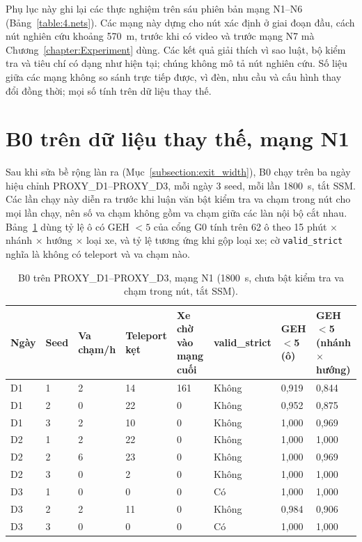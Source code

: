 \documentclass[../main.tex]{subfiles}
\begin{document}

Phụ lục này ghi lại các thực nghiệm trên sáu phiên bản mạng N1--N6 (Bảng~\ref{table:4.nets}). Các mạng này dựng cho nút xác định ở giai đoạn đầu, cách nút nghiên cứu khoảng 570~m, trước khi có video và trước mạng N7 mà Chương~\ref{chapter:Experiment} dùng. Các kết quả giải thích vì sao luật, bộ kiểm tra và tiêu chí có dạng như hiện tại; chúng không mô tả nút nghiên cứu. Số liệu giữa các mạng không so sánh trực tiếp được, vì đèn, nhu cầu và cấu hình thay đổi đồng thời; mọi số tính trên dữ liệu thay thế.

\section{B0 trên dữ liệu thay thế, mạng N1}
\label{subsection:b0_proxy}

Sau khi sửa bề rộng làn ra (Mục~\ref{subsection:exit_width}), B0 chạy trên ba ngày hiệu chỉnh PROXY\_D1--PROXY\_D3, mỗi ngày 3 seed, mỗi lần 1800~s, tắt SSM. Các lần chạy này diễn ra trước khi luận văn bật kiểm tra va chạm trong nút cho mọi lần chạy, nên số va chạm không gồm va chạm giữa các làn nội bộ cắt nhau. Bảng~\ref{table:4.b0} dùng tỷ lệ ô có GEH $<5$ của cổng G0 tính trên 62 ô theo 15 phút $\times$ nhánh $\times$ hướng $\times$ loại xe, và tỷ lệ tương ứng khi gộp loại xe; cờ \texttt{valid\_strict} nghĩa là không có teleport và va chạm nào.

\begin{table}[!htbp]
\centering
\small\setlength{\tabcolsep}{3pt}
\caption{B0 trên PROXY\_D1--PROXY\_D3, mạng N1 (1800~s, chưa bật kiểm tra va chạm trong nút, tắt SSM).} \label{table:4.b0}
\begin{tabular}{|p{1.3cm}|p{0.9cm}|p{1.5cm}|p{1.6cm}|p{1.8cm}|p{1.8cm}|p{1.6cm}|p{1.7cm}|}
\hline
\textbf{Ngày} & \textbf{Seed} & \textbf{Va chạm/h} & \textbf{Teleport kẹt} & \textbf{Xe chờ vào mạng cuối} & \textbf{valid\_\allowbreak strict} & \textbf{GEH$<$5 (ô)} & \textbf{GEH$<$5 (nhánh $\times$ hướng)} \\ \hline
D1 & 1 & 2 & 14 & 161 & Không & 0,919 & 0,844 \\ \hline
D1 & 2 & 0 & 22 & 0 & Không & 0,952 & 0,875 \\ \hline
D1 & 3 & 2 & 10 & 0 & Không & 1,000 & 0,969 \\ \hline
D2 & 1 & 2 & 22 & 0 & Không & 1,000 & 1,000 \\ \hline
D2 & 2 & 6 & 23 & 0 & Không & 1,000 & 0,969 \\ \hline
D2 & 3 & 0 & 2 & 0 & Không & 1,000 & 1,000 \\ \hline
D3 & 1 & 0 & 0 & 0 & Có & 1,000 & 1,000 \\ \hline
D3 & 2 & 2 & 11 & 0 & Không & 0,984 & 0,906 \\ \hline
D3 & 3 & 0 & 0 & 0 & Có & 1,000 & 1,000 \\ \hline
\end{tabular}
\end{table}
\end{document}
